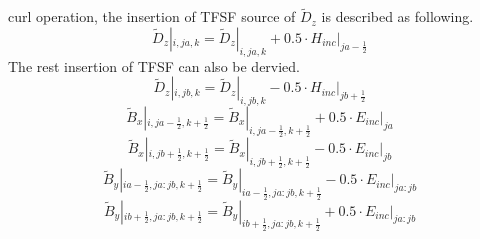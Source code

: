 curl operation, the insertion of TFSF source of $\widetilde{D}_z$ is described as following.
\begin{displaymath}
  \widetilde{D}_z|_{i,ja,k} = \widetilde{D}_z|_{i,ja,k} + 0.5 \cdot H_{inc}|_{ja-\frac{1}{2}}
\end{displaymath}
The rest insertion of TFSF can also be dervied.
\begin{displaymath}
  \widetilde{D}_z|_{i,jb,k} = \widetilde{D}_z|_{i,jb,k} - 0.5 \cdot H_{inc}|_{jb+\frac{1}{2}}  
\end{displaymath}
\begin{displaymath}
  \widetilde{B}_x|_{i,ja-\frac{1}{2},k+\frac{1}{2}}=\widetilde{B}_x|_{i,ja-\frac{1}{2},k+\frac{1}{2}}+0.5 \cdot E_{inc}|_{ja}
\end{displaymath}
\begin{displaymath}
  \widetilde{B}_x|_{i,jb+\frac{1}{2},k+\frac{1}{2}}=\widetilde{B}_x|_{i,jb+\frac{1}{2},k+\frac{1}{2}}-0.5 \cdot E_{inc}|_{jb}
\end{displaymath}
\begin{displaymath}
  \widetilde{B}_y|_{ia-\frac{1}{2},ja:jb,k+\frac{1}{2}}=\widetilde{B}_y|_{ia-\frac{1}{2},ja:jb,k+\frac{1}{2}}-0.5 \cdot E_{inc}|_{ja:jb}
\end{displaymath}
\begin{displaymath}
  \widetilde{B}_y|_{ib+\frac{1}{2},ja:jb,k+\frac{1}{2}}=\widetilde{B}_y|_{ib+\frac{1}{2},ja:jb,k+\frac{1}{2}}+0.5 \cdot E_{inc}|_{ja:jb}
\end{displaymath}






